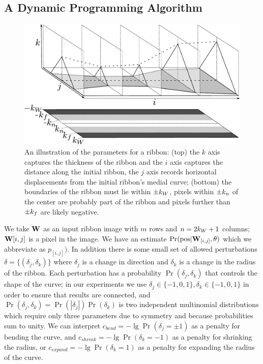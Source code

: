 \subsection{A Dynamic Programming Algorithm}

\begin{figure}[htb]
    \centering
    \includegraphics[width=0.95\columnwidth]{Figures/ribbon-3d-combined.pdf}
    \caption[3D Ribbon Image]{An illustration of the parameters for a ribbon: (top) the $k$ axis captures the thickness of the ribbon and the $i$ axis captures the distance along the initial ribbon, the $j$ axis records horizontal displacements from the initial ribbon's medial curve; (bottom) the boundaries of the ribbon must lie within $\pm k_W{}$, pixels within $\pm k_n{}$ of the center are probably part of the ribbon and pixels further than $\pm k_f{}$ are likely negative. }
    \label{fig:ribbon_3d}
\end{figure}

We take $\mathbf{W}{}$ as an input ribbon image with $m$ rows and $n=2k_W+1$ columns; $\mathbf{W}{}{[i,j]}$ is a pixel in the image. We have an estimate $\Pr(\text{pos}|\mathbf{W}{}_{[i,j]}, \theta)$ which we abbreviate as $p_{[i,j]})$. In addition there is some small set of allowed perturbations $\delta=\{(\delta_j, \delta_k)\}$ where $\delta_j$ is a change in direction and $\delta_k$ is a change in the radius of the ribbon. Each perturbation has a probability $\Pr(\delta_j, \delta_k)$ that controls the shape of the curve; in our experiments we use $\delta_j\in\{-1,0,1\}, \delta_k\in\{-1, 0,1\}$ in order to ensure that results are connected, and  $\Pr(\delta_j, \delta_k)=\Pr(|\delta_j|)\Pr(\delta_k)$ is two independent multinomial distributions which require only three parameters due to symmetry and because probabilities sum to unity. We can interpret $c_\mathit{bend}=-\lg \Pr(\delta_j=\pm1)$ as a penalty for bending the curve, and $c_\mathit{shrink}=-\lg \Pr(\delta_k=-1)$ as a penalty for shrinking the radius, or $c_\mathit{expand} = -\lg \Pr(\delta_k=1)$ as a penalty for expanding the radius of the curve. 

